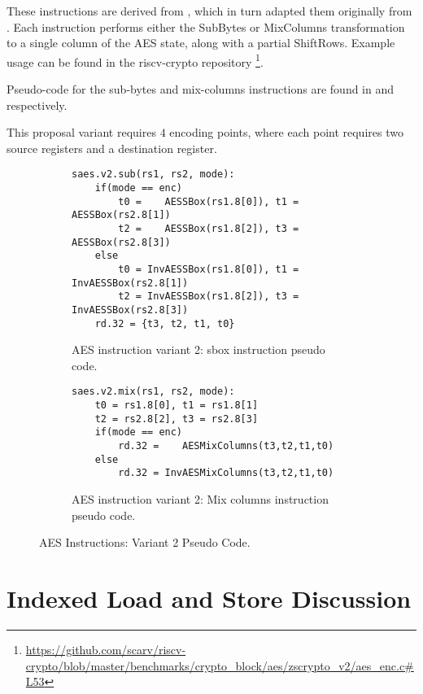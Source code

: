These instructions are derived from \cite{MPP:19}, which in turn adapted
them originally from \cite{TG:06}.
Each instruction performs either the SubBytes or MixColumns transformation
to a single column of the AES state, along with a partial ShiftRows.
Example usage can be found in the riscv-crypto repository
\footnote{\url{https://github.com/scarv/riscv-crypto/blob/master/benchmarks/crypto_block/aes/zscrypto_v2/aes_enc.c\#L53}}.

Pseudo-code for the sub-bytes and mix-columns instructions are found in
and
respectively.

This proposal variant requires $4$ encoding points, where each point
requires two source registers and a destination register.

\begin{figure}
\begin{subfigure}[b]{1.0\textwidth}
\begin{lstlisting}[language=pseudo]
saes.v2.sub(rs1, rs2, mode):
    if(mode == enc)
        t0 =    AESSBox(rs1.8[0]), t1 =    AESSBox(rs2.8[1])
        t2 =    AESSBox(rs1.8[2]), t3 =    AESSBox(rs2.8[3])
    else
        t0 = InvAESSBox(rs1.8[0]), t1 = InvAESSBox(rs2.8[1])
        t2 = InvAESSBox(rs1.8[2]), t3 = InvAESSBox(rs2.8[3])
    rd.32 = {t3, t2, t1, t0} 
\end{lstlisting}
\caption{AES instruction variant 2: sbox instruction pseudo code.}
\label{fig:pesudo:aes:v2:sub}
\end{subfigure}
\begin{subfigure}[b]{1.0\textwidth}
\begin{lstlisting}[language=pseudo]
saes.v2.mix(rs1, rs2, mode):
    t0 = rs1.8[0], t1 = rs1.8[1]
    t2 = rs2.8[2], t3 = rs2.8[3]
    if(mode == enc)
        rd.32 =    AESMixColumns(t3,t2,t1,t0)
    else
        rd.32 = InvAESMixColumns(t3,t2,t1,t0)
\end{lstlisting}
\caption{AES instruction variant 2: Mix columns instruction pseudo code.}
\label{fig:pesudo:aes:v2:mix}
\end{subfigure}
\caption{AES Instructions: Variant 2 Pseudo Code.}
\end{figure}





\section{Indexed Load and Store Discussion}
\label{sec:appendix:ildst}

